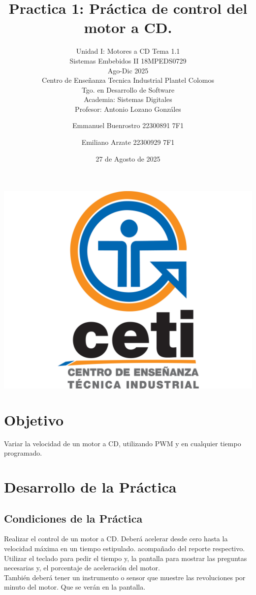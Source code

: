 \documentclass[11pt]{scrartcl}
\title {Practica 1: Práctica de control del motor a CD.}
\subtitle{Unidad I: Motores a CD Tema 1.1 \\ Sistemas Embebidos II 18MPEDS0729 \\ Ago-Dic 2025 \\ Centro de Enseñanza Tecnica Industrial Plantel Colomos\\Tgo. en Desarrollo de Software \\ Academia: Sistemas Digitales \\Profesor: Antonio Lozano Gonzáles }
\date{27 de Agosto de 2025}
\author{Emmanuel Buenrostro 22300891 7F1 \\ \and Emiliano Arzate 22300929 7F1 \\}
\begin{document}
\maketitle
\begin{center}
   \includegraphics[scale=0.15]{../../cetilogo.jpg} 
\end{center}
\newpage

\section{Objetivo}

Variar la velocidad de un motor a CD,  utilizando PWM y en cualquier tiempo programado.


\section{Desarrollo de la Práctica}

\subsection{Condiciones de la Práctica}

Realizar el control de un motor a CD. Deberá acelerar desde cero hasta
la velocidad máxima en un tiempo estipulado.  acompañado del reporte
respectivo. Utilizar el teclado para pedir el tiempo y, la pantalla para
mostrar las preguntas necesarias y, el porcentaje de aceleración del
motor.  \\
También deberá tener un instrumento o sensor que muestre las revoluciones por minuto del motor. Que se verán en la pantalla.
\end{document}
